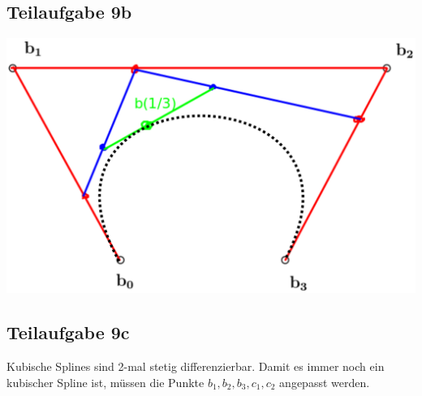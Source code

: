 \documentclass[a4paper]{scrartcl}
\begin{document}
\subsection*{Teilaufgabe 9b}
\includegraphics*[width=\linewidth, keepaspectratio]{9b-bezier.png}

\subsection*{Teilaufgabe 9c}
Kubische Splines sind 2-mal stetig differenzierbar. Damit es immer noch ein
kubischer Spline ist, müssen die Punkte $b_1, b_2, b_3, c_1, c_2$ angepasst
werden.
\end{document}
